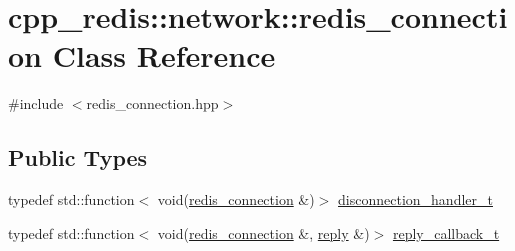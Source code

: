 \hypertarget{classcpp__redis_1_1network_1_1redis__connection}{}\section{cpp\+\_\+redis\+:\+:network\+:\+:redis\+\_\+connection Class Reference}
\label{classcpp__redis_1_1network_1_1redis__connection}


{\ttfamily \#include $<$redis\+\_\+connection.\+hpp$>$}

\subsection*{Public Types}
\begin{DoxyCompactItemize}
\item 
typedef std\+::function$<$ void(\mbox{\hyperlink{classcpp__redis_1_1network_1_1redis__connection}{redis\+\_\+connection}} \&)$>$ \mbox{\hyperlink{classcpp__redis_1_1network_1_1redis__connection_aba1a229a3d36a5540a80776ed0cf9a44}{disconnection\+\_\+handler\+\_\+t}}
\item 
typedef std\+::function$<$ void(\mbox{\hyperlink{classcpp__redis_1_1network_1_1redis__connection}{redis\+\_\+connection}} \&, \mbox{\hyperlink{classcpp__redis_1_1reply}{reply}} \&)$>$ \mbox{\hyperlink{classcpp__redis_1_1network_1_1redis__connection_a40f4b55a3103b7436e34211893377245}{reply\+\_\+callback\+\_\+t}}
\end{DoxyCompactItemize}
